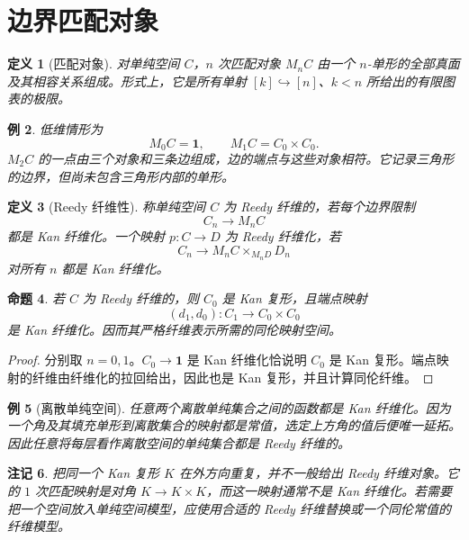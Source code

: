 \documentclass[12pt,oneside,openany,fontset=none]{ctexbook}
\theoremstyle{cn}
\newtheorem{definition}{定义}[chapter]
\newtheorem{example}[definition]{例}
\newtheorem{proposition}[definition]{命题}
\newtheorem{remark}[definition]{注记}
\numberwithin{equation}{chapter}
\newcommand{\one}{\mathbf 1}
\begin{document}
\section{边界匹配对象}
\begin{definition}[匹配对象]
对单纯空间 $C$，$n$ 次匹配对象 $M_nC$ 由一个 $n$-单形的全部真面及其相容关系组成。形式上，它是所有单射 $[k]\hookrightarrow[n]$、$k<n$ 所给出的有限图表的极限。
\end{definition}
\begin{example}
低维情形为
\[
M_0C=\one,
\qquad M_1C=C_0\times C_0.
\]
$M_2C$ 的一点由三个对象和三条边组成，边的端点与这些对象相符。它记录三角形的边界，但尚未包含三角形内部的单形。
\end{example}
\begin{definition}[Reedy 纤维性]
称单纯空间 $C$ 为 Reedy 纤维的，若每个边界限制
\[
C_n\longrightarrow M_nC
\]
都是 Kan 纤维化。一个映射 $p:C\to D$ 为 Reedy 纤维化，若
\[
C_n\longrightarrow M_nC\times_{M_nD}D_n
\]
对所有 $n$ 都是 Kan 纤维化。
\end{definition}
\begin{proposition}
若 $C$ 为 Reedy 纤维的，则 $C_0$ 是 Kan 复形，且端点映射
\[
(d_1,d_0):C_1\to C_0\times C_0
\]
是 Kan 纤维化。因而其严格纤维表示所需的同伦映射空间。
\end{proposition}
\begin{proof}
分别取 $n=0,1$。$C_0\to\one$ 是 Kan 纤维化恰说明 $C_0$ 是 Kan 复形。端点映射的纤维由纤维化的拉回给出，因此也是 Kan 复形，并且计算同伦纤维。
\end{proof}
\begin{example}[离散单纯空间]
任意两个离散单纯集合之间的函数都是 Kan 纤维化。因为一个角及其填充单形到离散集合的映射都是常值，选定上方角的值后便唯一延拓。因此任意将每层看作离散空间的单纯集合都是 Reedy 纤维的。
\end{example}
\begin{remark}
把同一个 Kan 复形 $K$ 在外方向重复，并不一般给出 Reedy 纤维对象。它的 $1$ 次匹配映射是对角 $K\to K\times K$，而这一映射通常不是 Kan 纤维化。若需要把一个空间放入单纯空间模型，应使用合适的 Reedy 纤维替换或一个同伦常值的纤维模型。
\end{remark}
\end{document}
